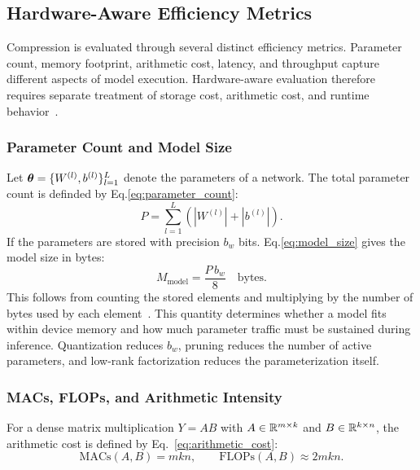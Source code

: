 
\subsection{Hardware-Aware Efficiency Metrics}

Compression is evaluated through several distinct efficiency metrics. Parameter count, memory footprint, arithmetic cost, latency, and throughput capture different aspects of model execution. Hardware-aware evaluation therefore requires separate treatment of storage cost, arithmetic cost, and runtime behavior~\cite{Sze2017EfficientDNN}.

\subsubsection{Parameter Count and Model Size}

Let $\bm{\theta} = \{W^{(l)}, b^{(l)}\}_{l=1}^{L}$ denote the parameters of a network. The total parameter count is definded by Eq.\eqref{eq:parameter_count}:
\begin{equation}
	\label{eq:parameter_count}
	P = \sum_{l=1}^{L} \left( |W^{(l)}| + |b^{(l)}| \right).
\end{equation}
If the parameters are stored with precision $b_w$ bits. Eq.\eqref{eq:model_size} gives the model size in bytes:
\begin{equation}
	\label{eq:model_size}
	M_{\text{model}} = \frac{P\, b_w}{8} \quad \text{bytes}.
\end{equation}
This follows from counting the stored elements and multiplying by the number of bytes used by each element~\cite{PyTorchNumel,PyTorchElementSize}.
This quantity determines whether a model fits within device memory and how much parameter traffic must be sustained during inference. Quantization reduces $b_w$, pruning reduces the number of active parameters, and low-rank factorization reduces the parameterization itself.

\subsubsection{MACs, FLOPs, and Arithmetic Intensity}

For a dense matrix multiplication $Y = AB$ with $A \in \mathbb{R}^{m \times k}$ and $B \in \mathbb{R}^{k \times n}$, the arithmetic cost is defined by Eq.~\eqref{eq:arithmetic_cost}:
\begin{equation}
	\label{eq:arithmetic_cost}
	\mathrm{MACs}(A,B) = mkn,
	\qquad
	\mathrm{FLOPs}(A,B) \approx 2mkn.
\end{equation}

